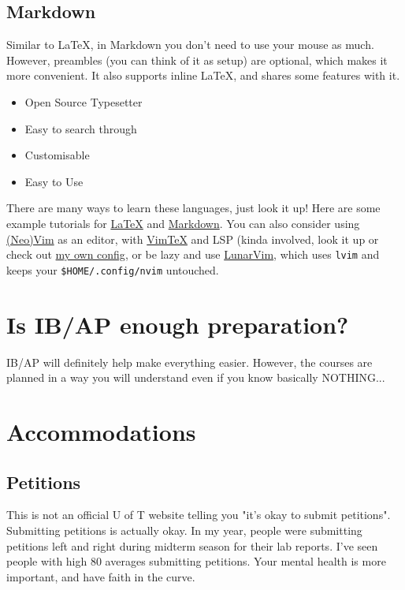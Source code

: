 \subsection{Markdown}

Similar to \LaTeX, in Markdown you don't need to use your mouse as much. However, preambles (you can think of it as setup) are optional, which makes it more convenient. It also supports inline \LaTeX, and shares some features with it.

\begin{itemize}
    \item Open Source Typesetter
    \item Easy to search through
    \item Customisable
    \item Easy to Use
\end{itemize}

There are many ways to learn these languages, just look it up! Here are some example tutorials for \href{https://www.overleaf.com/learn/latex/Learn_LaTeX_in_30_minutes}{\LaTeX} and \href{https://www.markdowntutorial.com/}{Markdown}. You can also consider using \href{https://neovim.io/}{(Neo)Vim} as an editor, with \href{https://github.com/lervag/vimtex}{VimTeX} and LSP (kinda involved, look it up or check out \href{https://github.com/latexsupremecist/Misc/blob/main/configurations/init.vim}{my own config}, or be lazy and use \href{https://www.lunarvim.org/}{LunarVim}, which uses \verb|lvim| and keeps your \verb|$HOME/.config/nvim| untouched.

\section{Is IB/AP enough preparation?}

IB/AP will definitely help make everything easier. However, the courses are planned in a way you will understand even if you know basically NOTHING...

\section{Accommodations}

\subsection{Petitions}

This is not an official U of T website telling you "it's okay to submit petitions". Submitting petitions is actually okay. In my year, people were submitting petitions left and right during midterm season for their lab reports. I've seen people with high 80 averages submitting petitions. Your mental health is more important, and have faith in the curve.


